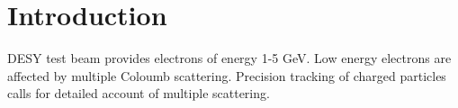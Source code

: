 \section{Introduction}
DESY test beam provides electrons of energy 1-5 GeV. Low energy electrons are affected by multiple Coloumb scattering. Precision tracking of charged particles calls for detailed account of multiple scattering.




